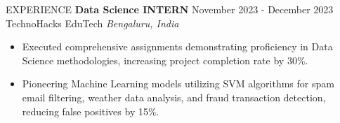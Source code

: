 \documentclass{resume} %
\begin{document}
\begin{rSection}{EXPERIENCE}
 \textbf{Data Science INTERN} \hfill November 2023 - December 2023\\
 TechnoHacks EduTech \hfill \textit{Bengaluru, India}
 \begin{itemize}
    \itemsep -3pt {} 
     \item Executed comprehensive assignments demonstrating proficiency in Data Science methodologies, increasing project completion rate by 30\%.
     \item Pioneering Machine Learning models utilizing SVM algorithms for spam email filtering, weather data analysis, and fraud transaction detection, reducing false positives by 15\%.
 \end{itemize}

\end{rSection} 



\end{document}
